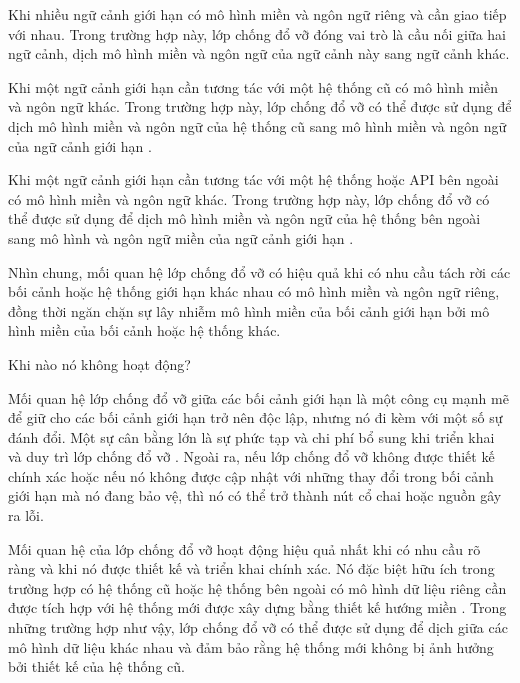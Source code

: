 Khi nhiều ngữ cảnh giới hạn có mô hình miền và ngôn ngữ riêng và cần giao tiếp với nhau. Trong trường hợp này, lớp chống đổ vỡ đóng vai trò là cầu nối giữa hai ngữ cảnh, dịch mô hình miền và ngôn ngữ của ngữ cảnh này sang ngữ cảnh khác.

Khi một ngữ cảnh giới hạn cần tương tác với một hệ thống cũ có mô hình miền và ngôn ngữ khác. Trong trường hợp này, lớp chống đổ vỡ có thể được sử dụng để dịch mô hình miền và ngôn ngữ của hệ thống cũ sang mô hình miền và ngôn ngữ của ngữ cảnh giới hạn .

Khi một ngữ cảnh giới hạn cần tương tác với một hệ thống hoặc API bên ngoài có mô hình miền và ngôn ngữ khác. Trong trường hợp này, lớp chống đổ vỡ có thể được sử dụng để dịch mô hình miền và ngôn ngữ của hệ thống bên ngoài sang mô hình và ngôn ngữ miền của ngữ cảnh giới hạn .

Nhìn chung, mối quan hệ lớp chống đổ vỡ có hiệu quả khi có nhu cầu tách rời các bối cảnh hoặc hệ thống giới hạn khác nhau có mô hình miền và ngôn ngữ riêng, đồng thời ngăn chặn sự lây nhiễm mô hình miền của bối cảnh giới hạn bởi mô hình miền của bối cảnh hoặc hệ thống khác.

Khi nào nó không hoạt động?

Mối quan hệ lớp chống đổ vỡ giữa các bối cảnh giới hạn là một công cụ mạnh mẽ để giữ cho các bối cảnh giới hạn trở nên độc lập, nhưng nó đi kèm với một số sự đánh đổi. Một sự cân bằng lớn là sự phức tạp và chi phí bổ sung khi triển khai và duy trì lớp chống đổ vỡ . Ngoài ra, nếu lớp chống đổ vỡ không được thiết kế chính xác hoặc nếu nó không được cập nhật với những thay đổi trong bối cảnh giới hạn mà nó đang bảo vệ, thì nó có thể trở thành nút cổ chai hoặc nguồn gây ra lỗi.

Mối quan hệ của lớp chống đổ vỡ hoạt động hiệu quả nhất khi có nhu cầu rõ ràng và khi nó được thiết kế và triển khai chính xác. Nó đặc biệt hữu ích trong trường hợp có hệ thống cũ hoặc hệ thống bên ngoài có mô hình dữ liệu riêng cần được tích hợp với hệ thống mới được xây dựng bằng thiết kế hướng miền . Trong những trường hợp như vậy, lớp chống đổ vỡ có thể được sử dụng để dịch giữa các mô hình dữ liệu khác nhau và đảm bảo rằng hệ thống mới không bị ảnh hưởng bởi thiết kế của hệ thống cũ.







